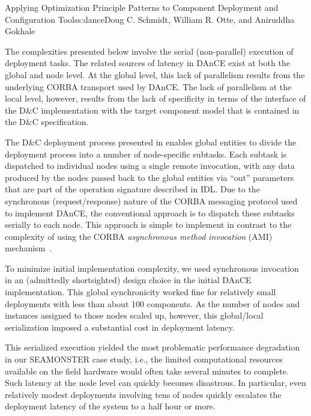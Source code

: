 \begin{aosachapter}{Applying Optimization Principle Patterns to Component Deployment and
                    Configuration Tools}{s:dance}{Doug C. Schmidt, William R. Otte, and Aniruddha Gokhale}

\label{sec.opp.serphase}


The complexities presented below involve the serial (non-parallel)
execution of deployment tasks. The related sources of latency in DAnCE
exist at both the global and node level. At the global level, this lack
of parallelism results from the underlying CORBA transport used by
DAnCE. The lack of parallelism at the local level, however, results from
the lack of specificity in terms of the interface of the D\&C
implementation with the target component model that is contained in the
D\&C specification.

The D\&C deployment process presented in
 enables global entities to divide the
deployment process into a number of node-specific subtasks. Each subtask
is dispatched to individual nodes using a single remote invocation, with
any data produced by the nodes passed back to the global entities via
``out'' parameters that are part of the operation signature described in
IDL. Due to the synchronous (request/response) nature of the CORBA
messaging protocol used to implement DAnCE, the conventional approach is
to dispatch these subtasks serially to each node. This approach is
simple to implement in contrast to the complexity of using the CORBA
\emph{asynchronous method invocation} (AMI)
mechanism~\cite{Schmidt:99w}.


To minimize initial implementation complexity, we used synchronous
invocation in an (admittedly shortsighted) design choice in the initial
DAnCE implementation. This global synchronicity worked fine for
relatively small deployments with less than about 100 components. As the
number of nodes and instances assigned to those nodes scaled up,
however, this global/local serialization imposed a substantial cost in
deployment latency.

This serialized execution yielded the most problematic performance
degradation in our SEAMONSTER case study, i.e., the limited
computational resources available on the field hardware would often take
several minutes to complete. Such latency at the node level can quickly
becomes disastrous. In particular, even relatively modest deployments
involving tens of nodes quickly escalates the deployment latency of the
system to a half hour or more.


\end{aosachapter}
